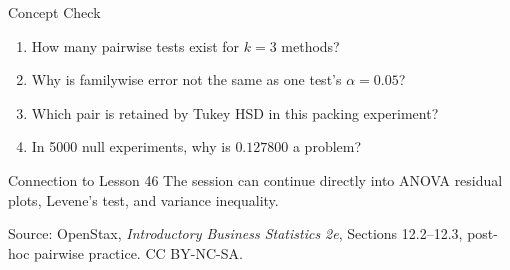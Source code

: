 \documentclass[aspectratio=169,10pt,english]{beamer}
\begin{document}
\begin{frame}{Concept Check}
  \begin{enumerate}
    \item How many pairwise tests exist for $k=3$ methods?
    \item Why is familywise error not the same as one test's $\alpha=0.05$?
    \item Which pair is retained by Tukey HSD in this packing experiment?
    \item In 5000 null experiments, why is $0.127800$ a problem?
  \end{enumerate}

  \vspace{0.6em}
  \begin{block}{Connection to Lesson 46}
    The session can continue directly into ANOVA residual plots, Levene's
    test, and variance inequality.
  \end{block}

  \vfill
  \scriptsize Source: OpenStax, \textit{Introductory Business Statistics 2e},
  Sections 12.2--12.3, post-hoc pairwise practice. CC BY-NC-SA.
\end{frame}

\appendix
\end{document}
